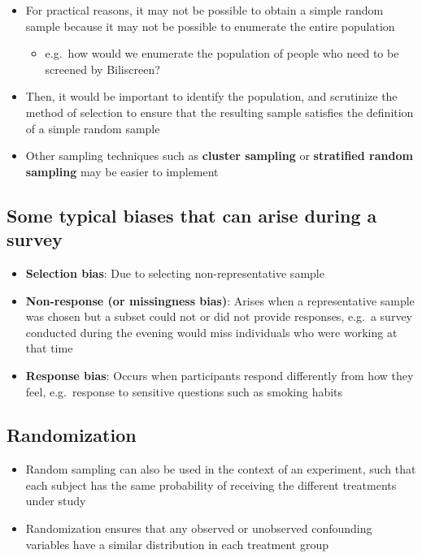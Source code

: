 \documentclass[
]{book}
\providecommand{\tightlist}{%
  \setlength{\itemsep}{0pt}\setlength{\parskip}{0pt}}
\begin{document}
\begin{itemize}
\tightlist
\item
  For practical reasons, it may not be possible to obtain a simple random sample because it may not be possible to enumerate the entire population

  \begin{itemize}
  \tightlist
  \item
    e.g.~how would we enumerate the population of people who need to be screened by Biliscreen?
  \end{itemize}
\item
  Then, it would be important to identify the population, and scrutinize the method of selection to ensure that the resulting sample satisfies the definition of a simple random sample
\item
  Other sampling techniques such as \textbf{cluster sampling} or \textbf{stratified random sampling} may be easier to implement
\end{itemize}

\hypertarget{some-typical-biases-that-can-arise-during-a-survey}{%
\subsection{Some typical biases that can arise during a survey}\label{some-typical-biases-that-can-arise-during-a-survey}}

\begin{itemize}
\tightlist
\item
  \textbf{Selection bias}: Due to selecting non-representative sample
\item
  \textbf{Non-response (or missingness bias)}: Arises when a representative sample was chosen but a subset could not or did not provide responses, e.g.~a survey conducted during the evening would miss individuals who were working at that time
\item
  \textbf{Response bias}: Occurs when participants respond differently from how they feel, e.g.~response to sensitive questions such as smoking habits
\end{itemize}

\hypertarget{randomization}{%
\subsection{Randomization}\label{randomization}}

\begin{itemize}
\tightlist
\item
  Random sampling can also be used in the context of an experiment, such that each subject has the same probability of receiving the different treatments under study
\item
  Randomization ensures that any observed or unobserved confounding variables have a similar distribution in each treatment group
\end{itemize}
\end{document}

